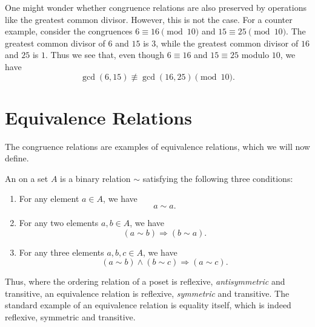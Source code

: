 \begin{remark}
  One might wonder whether congruence relations are also preserved by operations like the greatest common divisor. However, this is not the case. For a counter example, consider the congruences $6\equiv 16\pmod{10}$ and $15\equiv 25\pmod{10}$. The greatest common divisor of $6$ and $15$ is $3$, while the greatest common divisor of $16$ and $25$ is $1$. Thus we see that, even though $6\equiv 16$ and $15\equiv 25$ modulo $10$, we have
  \begin{equation*}
    \gcd(6,15)\nequiv\gcd(16,25) \pmod{10}.
  \end{equation*}
\end{remark}

\section{Equivalence Relations}

The congruence relations are examples of equivalence relations, which we will now define.

\begin{definition}
  An  on a set $A$ is a binary relation $\sim$ satisfying the following three conditions:
  \begin{enumerate}
  \item {} For any element $a\in A$, we have
    \begin{equation*}
      a\sim a.
    \end{equation*}
  \item {} For any two elements $a,b\in A$, we have
    \begin{equation*}
      (a \sim b) \Rightarrow (b\sim a).
    \end{equation*}
  \item {}
    For any three elements $a,b,c\in A$, we have
    \begin{equation*}
      (a \sim b)\land (b\sim c) \Rightarrow (a\sim c).
    \end{equation*}
  \end{enumerate}
\end{definition}

Thus, where the ordering relation of a poset is reflexive, \emph{antisymmetric} and transitive, an equivalence relation is reflexive, \emph{symmetric} and transitive. The standard example of an equivalence relation is equality itself, which is indeed reflexive, symmetric and transitive.

